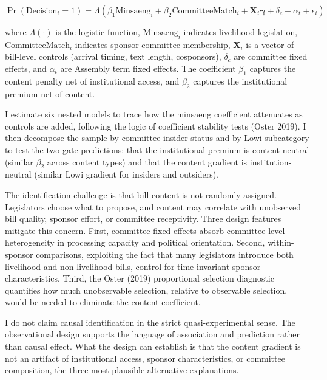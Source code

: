 \documentclass[11pt]{article}
\begin{document}
\begin{equation}
\Pr(\text{Decision}_i = 1) = \Lambda(\beta_1 \text{Minsaeng}_i + \beta_2 \text{CommitteeMatch}_i + \mathbf{X}_i \boldsymbol{\gamma} + \delta_c + \alpha_t + \epsilon_i)
\label{eq:main}
\end{equation}

\noindent where $\Lambda(\cdot)$ is the logistic function, $\text{Minsaeng}_i$ indicates livelihood legislation, $\text{CommitteeMatch}_i$ indicates sponsor-committee membership, $\mathbf{X}_i$ is a vector of bill-level controls (arrival timing, text length, cosponsors), $\delta_c$ are committee fixed effects, and $\alpha_t$ are Assembly term fixed effects. The coefficient $\beta_1$ captures the content penalty net of institutional access, and $\beta_2$ captures the institutional premium net of content.

I estimate six nested models to trace how the minsaeng coefficient attenuates as controls are added, following the logic of coefficient stability tests (Oster 2019). I then decompose the sample by committee insider status and by Lowi subcategory to test the two-gate predictions: that the institutional premium is content-neutral (similar $\beta_2$ across content types) and that the content gradient is institution-neutral (similar Lowi gradient for insiders and outsiders).

The identification challenge is that bill content is not randomly assigned. Legislators choose what to propose, and content may correlate with unobserved bill quality, sponsor effort, or committee receptivity. Three design features mitigate this concern. First, committee fixed effects absorb committee-level heterogeneity in processing capacity and political orientation. Second, within-sponsor comparisons, exploiting the fact that many legislators introduce both livelihood and non-livelihood bills, control for time-invariant sponsor characteristics. Third, the Oster (2019) proportional selection diagnostic quantifies how much unobservable selection, relative to observable selection, would be needed to eliminate the content coefficient.

I do not claim causal identification in the strict quasi-experimental sense. The observational design supports the language of association and prediction rather than causal effect. What the design can establish is that the content gradient is not an artifact of institutional access, sponsor characteristics, or committee composition, the three most plausible alternative explanations.
\end{document}
